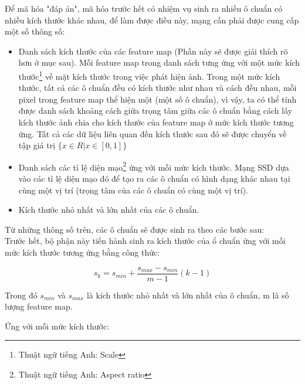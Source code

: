 \documentclass[a4paper,12pt]{article}
\begin{document}
	Để mã hóa "đáp án", mã hóa trước hết có nhiệm vụ sinh ra nhiều ô chuẩn có nhiều kích thước khác nhau, để làm được điều này, mạng cần phải được cung cấp một số thông số:\\
	\begin{itemize}
		\item Danh sách kích thước của các feature map (Phần này sẽ được giải thích rõ hơn ở mục sau). Mỗi feature map trong danh sách tưng ứng với một mức kích thước\footnote{Thuật ngữ tiếng Anh: Scale} về mặt kích thước trong việc phát hiện ảnh. Trong một mức kích thước, tất cả các ô chuẩn đều có kích thước như nhau và cách đều nhau, mỗi pixel trong feature map thể hiện một (một số ô chuẩn), vì vậy, ta có thể tính được danh sách khoảng cách giữa trọng tâm giữa các ô chuẩn bằng cách lấy kích thước ảnh chia cho kích thước của feature map ở mức kích thước tương ứng. Tất cả các dữ liệu liên quan đến kích thước sau đó sẽ được chuyển về tập giá trị $\{x \in R | x \in [0, 1] \} $ 
		\item Danh sách các tỉ lệ diện mạo\footnote{Thuật ngữ tiếng Anh: Aspect ratio} ứng với mỗi mức kích thước. Mạng SSD dựa vào các tỉ lệ diện mạo đó để tạo ra các ô chuẩn có hình dạng khác nhau tại cùng một vị trí (trọng tâm của các ô chuẩn có cùng một vị trí).
		\item Kích thước nhỏ nhất và lớn nhất của các ô chuẩn.
	\end{itemize} 
	
	Từ những thông số trên, các ô chuẩn sẽ được sinh ra theo các bước sau: \\
	Trước hết, bộ phận này tiến hành sinh ra kích thước của ổ chuẩn ứng với mỗi mức kích thước tương ứng bằng công thức: 
	
	$$s_k = s_{min} + \frac{s_{max} - s_{min}}{m - 1}(k - 1) $$
	
	Trong đó $s_{min}$ và $s_{max}$ là kích thước nhỏ nhất và lớn nhất của ô chuẩn, m là số lượng feature map.
	
	Ứng với mỗi mức kích thước:
	
\end{document}
